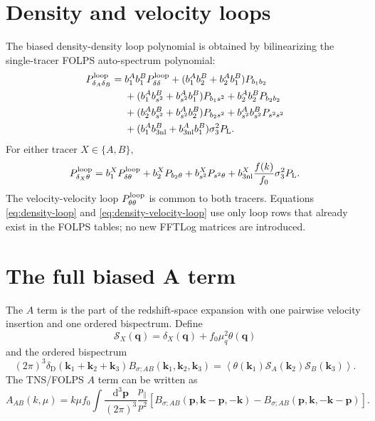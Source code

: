 \documentclass[11pt]{article}
\newcommand{\dd}{\mathrm{d}}
\newcommand{\bk}{\bm{k}}
\newcommand{\bp}{\bm{p}}
\newcommand{\PL}{P_{\mathrm L}}
\newcommand{\PD}{\delta_{\mathrm D}}
\newcommand{\intp}{\int\!\frac{\dd^3\bp}{(2\pi)^3}}
\newcommand{\bsst}{b_{s^2}}
\begin{document}
\section{Density and velocity loops}

The biased density-density loop polynomial is obtained by bilinearizing the
single-tracer FOLPS auto-spectrum polynomial:
\begin{align}
P_{\delta_A\delta_B}^{\rm loop}
={}&b_1^A b_1^B P_{\delta\delta}^{\rm loop}
+(b_1^A b_2^B+b_2^A b_1^B)P_{b_1b_2}
\nonumber\\
&+(b_1^A \bsst^B+\bsst^A b_1^B)P_{b_1s^2}
+b_2^A b_2^B P_{b_2b_2}
\nonumber\\
&+(b_2^A \bsst^B+\bsst^A b_2^B)P_{b_2s^2}
+\bsst^A \bsst^B P_{s^2s^2}
\nonumber\\
&+(b_1^A b_{3\mathrm{nl}}^B+b_{3\mathrm{nl}}^A b_1^B)
\sigma_3^2\PL .
\label{eq:density-loop}
\end{align}
For either tracer $X\in\{A,B\}$,
\begin{equation}
P_{\delta_X\theta}^{\rm loop}
=
b_1^X P_{\delta\theta}^{\rm loop}
+b_2^X P_{b_2\theta}
+\bsst^X P_{s^2\theta}
+b_{3\mathrm{nl}}^X\frac{f(k)}{f_0}\sigma_3^2\PL .
\label{eq:density-velocity-loop}
\end{equation}
The velocity-velocity loop $P_{\theta\theta}^{\rm loop}$ is common to both
tracers.  Equations \eqref{eq:density-loop} and
\eqref{eq:density-velocity-loop} use only loop rows that already exist in the
FOLPS tables; no new FFTLog matrices are introduced.

\section{The full biased A term}
\label{sec:Aterm}

The $A$ term is the part of the redshift-space expansion with one pairwise
velocity insertion and one ordered bispectrum.  Define
\begin{equation}
  \mathcal{S}_X(\bm{q})
  =
  \delta_X(\bm{q})+f_0\mu_q^2\theta(\bm{q})
\end{equation}
and the ordered bispectrum
\begin{equation}
  (2\pi)^3\PD(\bk_1+\bk_2+\bk_3)
  B_{\sigma;AB}(\bk_1,\bk_2,\bk_3)
  =
  \left\langle
    \theta(\bk_1)\mathcal{S}_A(\bk_2)\mathcal{S}_B(\bk_3)
  \right\rangle .
\end{equation}
The TNS/FOLPS $A$ term can be written as
\begin{equation}
  A_{AB}(k,\mu)=
  k\mu f_0\intp
  \frac{p_\parallel}{p^2}
  \left[
  B_{\sigma;AB}(\bp,\bk-\bp,-\bk)
  -
  B_{\sigma;AB}(\bp,\bk,-\bk-\bp)
  \right].
\end{equation}
\end{document}
